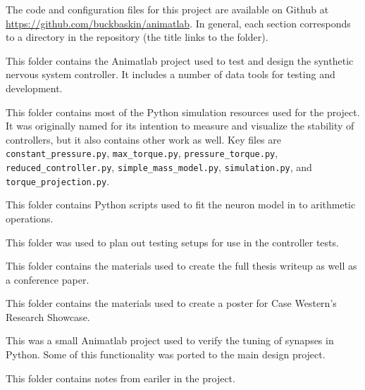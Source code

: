 The code and configuration files for this project are available on Github at \url{https://github.com/buckbaskin/animatlab}. In general, each section corresponds to a directory in the repository (the title links to the folder).


This folder contains the Animatlab project used to test and design the synthetic nervous system controller. It includes a number of data tools for testing and development.


This folder contains most of the Python simulation resources used for the project. It was originally named for its intention to measure and visualize the stability of controllers, but it also contains other work as well. Key files are \texttt{constant\_pressure.py}, \texttt{max\_torque.py}, \texttt{pressure\_torque.py}, \texttt{reduced\_controller.py}, \texttt{simple\_mass\_model.py}, \texttt{simulation.py}, and \texttt{torque\_projection.py}.


This folder contains Python scripts used to fit the neuron model in \cite{NickFunctionalSubnetwork} to arithmetic operations.


This folder was used to plan out testing setups for use in the controller tests.


This folder contains the materials used to create the full thesis writeup as well as a conference paper.


This folder contains the materials used to create a poster for Case Western's Research Showcase.


This was a small Animatlab project used to verify the tuning of synapses in Python. Some of this functionality was ported to the main design project.


This folder contains notes from eariler in the project.